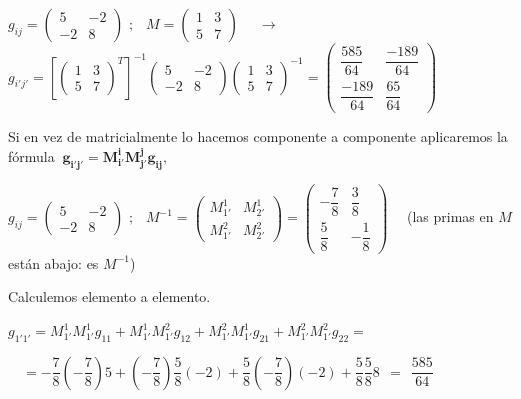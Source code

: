 $g_{ij}= \left( \begin{matrix} 5&-2\\-2&8 \end{matrix} \right)$
$; \ \ $
$M=\left( \begin{matrix} 1&3\\5&7 \end{matrix} \right)$
$ \quad \to \quad $ 
$g_{i'j'}=\left[  \left( \begin{matrix} 1&3\\5&7 \end{matrix} \right)^T   \right]^{-1}
\left( \begin{matrix} 5&-2\\-2&8 \end{matrix} \right)
\left( \begin{matrix} 1&3\\5&7 \end{matrix} \right)^{-1}=
\left( \begin{matrix} \dfrac{585}{64}&\dfrac{-189}{64}\\\dfrac{-189}{64}&\dfrac{65}{64} \end{matrix} \right)$

Si en vez de matricialmente lo hacemos componente a componente aplicaremos la fórmula $\ \boldsymbol{ g_{i'j'}=M^i_{i'}M^j_{j'}g_{ij} } ,\ $
\textcolor{gris}{}

$g_{ij}= \left( \begin{matrix} 5&-2\\-2&8 \end{matrix} \right)$
$; \ \ $
$M^{-1}=\left( \begin{matrix} M^1_{1'}&M^1_{2'}\\M^2_{1'}&M^2_{2'} \end{matrix} \right)=
\left( \begin{matrix} -\dfrac 7 8&\dfrac 3 8\\\dfrac 5 8&-\dfrac 1 8 \end{matrix} \right)\quad $ \textcolor{gris}{(las primas en $M$ están abajo: es $M^{-1}$)}

Calculemos elemento a elemento.

$g_{1'1'}=M^1_{1'}M^1_{1'}g_{11}+M^1_{1'}M^2_{1'}g_{12}+M^2_{1'}M^1_{1'}g_{21}+M^2_{1'}M^2_{1'}g_{22}=$

$\quad = -\dfrac 7 8 \left( -\dfrac 7 8\right) 5 + (-\dfrac 7 8) \dfrac 5 8 (-2)+ \dfrac 5 8 \left( - \dfrac 7 8 \right) (-2) + \dfrac 5 8 \dfrac 5 8 8\ \  =\ \  \dfrac{585}{64}$

